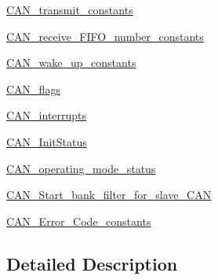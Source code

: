 \begin{DoxyCompactItemize}
\hyperlink{group___c_a_n__transmit__constants}{C\-A\-N\-\_\-transmit\-\_\-constants}
\item 
\hyperlink{group___c_a_n__receive___f_i_f_o__number__constants}{C\-A\-N\-\_\-receive\-\_\-\-F\-I\-F\-O\-\_\-number\-\_\-constants}
\item 
\hyperlink{group___c_a_n__wake__up__constants}{C\-A\-N\-\_\-wake\-\_\-up\-\_\-constants}
\item 
\hyperlink{group___c_a_n__flags}{C\-A\-N\-\_\-flags}
\item 
\hyperlink{group___c_a_n__interrupts}{C\-A\-N\-\_\-interrupts}
\item 
\hyperlink{group___c_a_n___init_status}{C\-A\-N\-\_\-\-Init\-Status}
\item 
\hyperlink{group___c_a_n__operating__mode__status}{C\-A\-N\-\_\-operating\-\_\-mode\-\_\-status}
\item 
\hyperlink{group___c_a_n___start__bank__filter__for__slave___c_a_n}{C\-A\-N\-\_\-\-Start\-\_\-bank\-\_\-filter\-\_\-for\-\_\-slave\-\_\-\-C\-A\-N}
\item 
\hyperlink{group___c_a_n___error___code__constants}{C\-A\-N\-\_\-\-Error\-\_\-\-Code\-\_\-constants}
\end{DoxyCompactItemize}


\subsection{Detailed Description}

